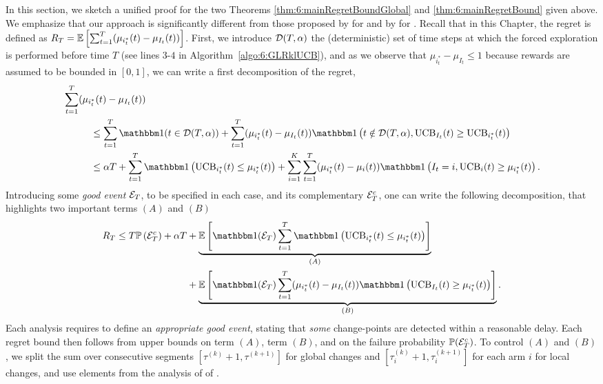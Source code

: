 In this section, we sketch a unified proof for the two Theorems \ref{thm:6:mainRegretBoundGlobal} and \ref{thm:6:mainRegretBound} given above.
We emphasize that our approach is significantly different from those proposed by \cite{CaoZhenKvetonXie18} for \MUCB{} and by \cite{LiuLeeShroff17} for \CUSUMUCB.
%
Recall that in this Chapter, the regret is defined as $R_T = \mathbb{E}\left[\sum_{t=1}^T(\mu_{i^*_t}(t) - \mu_{I_t}(t))\right]$.
First, we introduce $\mathcal{D}(T,\alpha)$ the (deterministic) set of time steps at which the forced exploration is performed before time $T$ (see lines $3$-$4$ in Algorithm~\ref{algo:6:GLRklUCB}),
and as we observe that $\mu_{i^*_t} - \mu_{I_t} \leq 1$ because rewards are assumed to be bounded in $[0,1]$,
we can write a first decomposition of the regret,
\begin{align*}
 & \sum_{t=1}^T (\mu_{i^*_t}(t) - \mu_{I_t}(t)) \\
 & \hspace{1cm} \leq  \sum_{t=1}^{T} \indic(t \in \cD(T,\alpha)) + \sum_{t=1}^T (\mu_{i^*_t}(t) - \mu_{I_t}(t))\indic\left(t \notin\cD(T,\alpha), \UCB_{I_t}(t) \geq \UCB_{i^*_t}(t)\right) \\
 & \hspace{1cm}\leq  \alpha T + \sum_{t=1}^T \indic\left(\UCB_{i^*_t}(t) \leq \mu_{i^*_t}(t)\right) + \sum_{i=1}^K\sum_{t=1}^T (\mu_{i^*_t}(t) - \mu_{i}(t))\indic\left(I_t = i, \UCB_{i}(t) \geq \mu_{i^*_t}(t)\right).
\end{align*}
%
Introducing some \emph{good event} $\mathcal{E}_T$, to be specified in each case, and its complementary $\mathcal{E}_T^c$, one can write the following decomposition, that highlights two important terms $(A)$ and $(B)$
%
\begin{align}\label{eq:6:GeneRegretBound}
    R_T \leq T \bP\left(\cE_T^c\right) + \alpha T & + \underbrace{\bE\left[\indic(\cE_T) \sum_{t=1}^T \indic\left(\UCB_{i^*_t}(t) \leq \mu_{i^*_t}(t)\right)\right]}_{(A)} \\
    & + \underbrace{\bE\left[\indic(\cE_T)\sum_{t=1}^T (\mu_{i^*_t}(t) - \mu_{I_t}(t))\indic\left(\UCB_{I_t}(t) \geq \mu_{i^*_t}(t)\right)\right]}_{(B)}. \nonumber
\end{align}
%
Each analysis requires to define an \emph{appropriate good event}, stating that \emph{some} change-points are detected within a reasonable delay. Each regret bound then follows from upper bounds on term $(A)$, term $(B)$, and on the failure probability $\mathbb{P}(\mathcal{E}_T^c)$.
%
To control $(A)$ and $(B)$, we split the sum over consecutive segments $[\tau^{(k)}+1, \tau^{(k+1)}]$ for global changes and $[\tau^{(k)}_i+1, \tau^{(k+1)}_i]$ for each arm $i$ for local changes, and use elements from the analysis of \klUCB{} of \cite{KLUCBJournal}.

